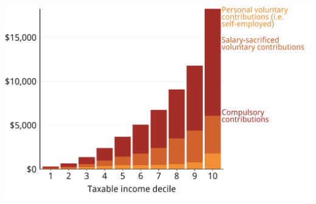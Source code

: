 \documentclass[tikz]{standalone}\usepackage[]{graphicx}\usepackage[]{color}
\newenvironment{knitrout}{}{} %
\begin{document}
\begin{knitrout}
\color{fgcolor}
\includegraphics[width=11.000in,height=7.00in]{./Super-tax-targeting/b5-super-atlas/Figure4-4-1} 

\end{knitrout}
\end{document}
